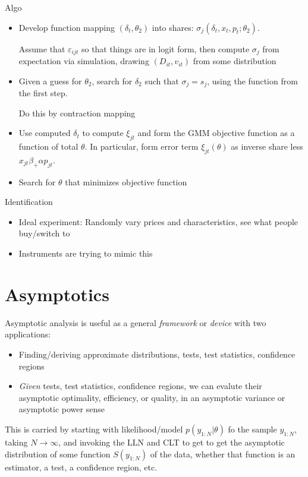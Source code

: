 \documentclass[12pt]{article}
\theoremstyle{plain}
\theoremstyle{definition}
\theoremstyle{remark}
\newcommand{\ra}{\rightarrow}
\begin{document}
Algo
\begin{itemize}
  \item Develop function mapping $(\delta_t,\theta_2)$ into shares:
    $\sigma_j(\delta_t,x_t,p_t;\theta_2)$.

    Assume that $\varepsilon_{ijt}$ so that things are in logit form,
    then compute $\sigma_j$ from expectation via simulation, drawing
    $(D_{it},v_{it})$ from some distribution

  \item Given a guess for $\theta_2$, search for $\delta_2$ such that
    $\sigma_j=s_j$, using the function from the first step.

    Do this by contraction mapping

  \item
    Use computed $\delta_t$ to compute $\xi_{jt}$ and form the GMM
    objective function as a function of total $\theta$.
    In particular, form error term $\xi_{jt}(\theta)$ as
    inverse share less $x_{jt}\beta_+\alpha p_{jt}$.

  \item Search for $\theta$ that minimizes objective function
\end{itemize}
Identification
\begin{itemize}
  \item Ideal experiment: Randomly vary prices and characteristics, see
    what people buy/switch to
  \item Instruments are trying to mimic this
\end{itemize}




\clearpage
\section{Asymptotics}

Asymptotic analysis is useful as a general \emph{framework} or
\emph{device} with two applications:
\begin{itemize}
  \item Finding/deriving approximate distributions, tests,
    test statistics, confidence regions
  \item \emph{Given} tests, test statistics, confidence regions,
    we can evalute their asymptotic optimality, efficiency, or quality,
    in an asymptotic variance or asymptotic power sense
\end{itemize}
This is carried by starting with likelihood/model $p(y_{1:N}|\theta)$ fo
the sample $y_{1:N}$, taking $N\ra\infty$, and invoking the LLN and CLT
to get to get the asymptotic distribution of some function $S(y_{1:N})$
of the data, whether that function is an estimator, a test, a confidence
region, etc.
\end{document}

